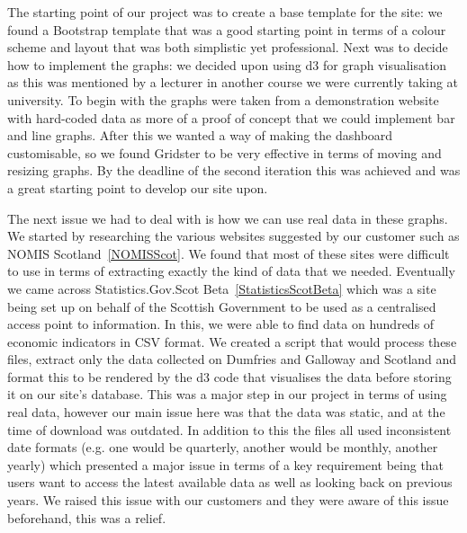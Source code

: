\documentclass{l3proj}
\begin{document}
The starting point of our project was to create a base template for the site: we found a Bootstrap template that was a good starting
point in terms of a colour scheme and layout that was both simplistic yet professional. Next was to decide how to implement the
graphs: we decided upon using d3 for graph visualisation as this was mentioned by a lecturer in another course we were currently
taking at university. To begin with the graphs were taken from a demonstration website with hard-coded data as more of a proof
of concept that we could implement bar and line graphs. After this we wanted a way of making the dashboard customisable, so we
found Gridster to be very effective in terms of moving and resizing graphs. By the deadline of the second iteration this was
achieved and was a great starting point to develop our site upon.

The next issue we had to deal with is how we can use real data in these graphs. We started by researching the various websites
suggested by our customer such as NOMIS Scotland~\ref{NOMISScot}. We found that most of these sites were difficult to use in terms of extracting
exactly the kind of data that we needed. Eventually we came across Statistics.Gov.Scot Beta~\ref{StatisticsScotBeta} which was a site being set up on behalf of
the Scottish Government to be used as a centralised access point to information. In this, we were able to find data on
hundreds of economic indicators in CSV format. We created a script that would process these files, extract only the data collected
on Dumfries and Galloway and Scotland and format this to be rendered by the d3 code that visualises the data before storing it on
our site's database. This was a major step in our project in terms of using real data, however our main issue here was that the
data was static, and at the time of download was outdated. In addition to this the files all used inconsistent date formats (e.g.
one would be quarterly, another would be monthly, another yearly) which presented a major issue in terms of a key requirement
being that users want to access the latest available data as well as looking back on previous years. We raised this issue
with our customers and they were aware of this issue beforehand, this was a relief.
\end{document}

